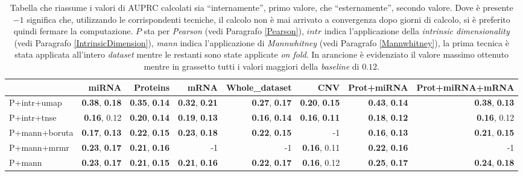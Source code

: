 \documentclass[12pt,italian]{report}
\begin{document}
	
	\begin{table}[h!]
		\begin{center}
			\begin{adjustbox}{max width=\textwidth}
				\begin{tabular}{lrrrrrrr}
					\toprule
					{} &    miRNA &  Proteins &  mRNA &  Whole\_dataset & CNV & Prot+miRNA & Prot+miRNA+mRNA\\
					\midrule
					P+intr+umap & \textbf{0.38}, \textbf{0.18} & \textbf{0.35}, \textbf{0.14}& \textbf{0.32}, \textbf{0.21}& \textbf{0.27}, \textbf{0.17}& \textbf{0.20}, \textbf{0.15}& \cellcolor{orange}\textbf{0.43}, \textbf{0.14}& \textbf{0.38}, \textbf{0.13} \\
					P+intr+tnse & \textbf{0.16}, 0.12 & \textbf{0.20}, \textbf{0.14} & \textbf{0.19}, \textbf{0.13} & \textbf{0.16}, \textbf{0.14} & \textbf{0.16}, \textbf{0.11} & \textbf{0.18}, \textbf{0.12} & \textbf{0.16}, 0.12 \\
					P+mann+boruta & \textbf{0.17}, \textbf{0.13} & \textbf{0.22}, \textbf{0.15} & \textbf{0.23}, \textbf{0.18} &\textbf{0.22}, \textbf{0.15} & -1 & \textbf{0.16}, \textbf{0.13} & \textbf{0.21}, \textbf{0.15 }\\
					P+mann+mrmr & \textbf{0.23}, \textbf{0.17}&\textbf{0.21}, \textbf{0.16} & -1&-1 &\textbf{0.16}, 0.11 & \textbf{0.22}, \textbf{0.16} &-1 \\
					P+mann &\textbf{0.23}, \textbf{0.17}& \textbf{0.21}, \textbf{0.15}& \textbf{0.21}, \textbf{0.16} & \textbf{0.22}, \textbf{0.17} & \textbf{0.16}, 0.12& \textbf{0.25}, \textbf{0.17} & \textbf{0.24}, \textbf{0.18}\\
					\bottomrule
				\end{tabular}
			\end{adjustbox}
		\end{center}
	\caption{Tabella che riassume i valori di AUPRC calcolati sia ``internamente'', primo valore, che ``esternamente'', secondo valore. Dove è presente $-1$ significa che, utilizzando le corrispondenti tecniche, il calcolo non è mai arrivato a convergenza dopo giorni di calcolo, si è preferito quindi fermare la computazione. $P$ sta per \textit{Pearson} (vedi Paragrafo \ref{Pearson}), $intr$ indica l'applicazione della \textit{intrinsic dimensionality} (vedi Paragrafo \ref{IntrinsicDimension}), \textit{mann} indica l'applicazione di  \textit{Mannwhitney} (vedi Paragrafo \ref{Mannwhitney}), la prima tecnica è stata applicata all'intero \textit{dataset} mentre le restanti sono state applicate \textit{on fold}. In arancione è evidenziato il valore massimo ottenuto mentre in grassetto tutti i valori maggiori della \textit{baseline} di $0.12$.}
	\label{AUPRC_on_fold}
	\end{table}
\end{document}
